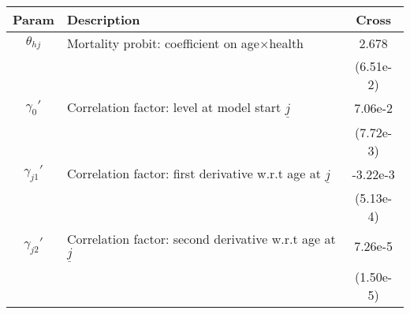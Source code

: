 \begin{table}[ht]\label{CrossMenCorrParams}
\footnotesize
\begin{center}
\begin{tabular}{clc}
\hline \hline
Param & Description & Cross \\
\hline
$\theta_{hj}$ & Mortality probit: coefficient on age$\times$health & 2.678 \\
 & & (6.51e-2) \\
$\gamma_{0}'$ & Correlation factor: level at model start $\underline{j}$ & 7.06e-2 \\
 & & (7.72e-3) \\
$\gamma_{j1}'$ & Correlation factor: first derivative w.r.t age at $\underline{j}$ & -3.22e-3 \\
 & & (5.13e-4) \\
$\gamma_{j2}'$ & Correlation factor: second derivative w.r.t age at $\underline{j}$ & 7.26e-5 \\
 & & (1.50e-5) \\
\hline\hline
\end{tabular}
\end{center}
\end{table}
